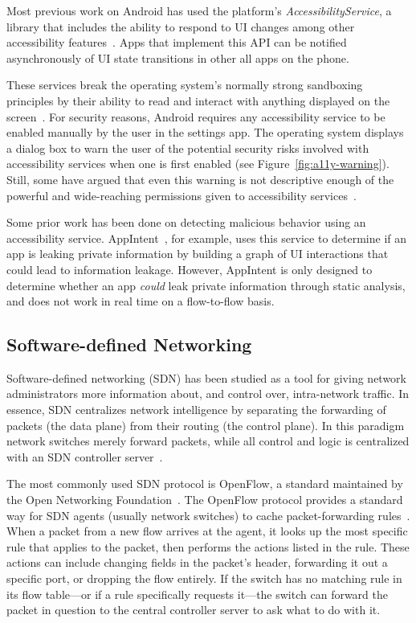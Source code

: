Most previous work on Android has used the platform's
\textit{AccessibilityService}, a library that includes the ability to respond to
UI changes among other accessibility features~\cite{googledevelopers2020}. Apps
that implement this API can be notified asynchronously of UI state transitions
in other all apps on the phone.

These services break the operating system's normally strong
sandboxing principles by their ability to read and interact with anything
displayed on the screen~\cite{kalysch2018}. For security reasons, Android
requires any accessibility service to be enabled manually by the user in the
settings app. The operating system displays a dialog box to warn the user of the
potential security risks involved with accessibility services when one is first
enabled (see Figure~\ref{fig:a11y-warning}). Still, some have argued that even
this warning is not descriptive enough of the powerful and wide-reaching
permissions given to accessibility services~\cite{kalysch2018}.

Some prior work has been done on detecting malicious behavior using an
accessibility service. AppIntent~\cite{yang2013}, for example, uses this service
to determine if an app is leaking private information by building a graph of UI
interactions that could lead to information leakage. However, AppIntent is only
designed to determine whether an app \textit{could} leak private information
through static analysis, and does not work in real time on a flow-to-flow basis.

\subsection{Software-defined Networking}
\label{sec:software-defined-networking}

Software-defined networking (SDN) has been studied as a tool for giving network
administrators more information about, and control over, intra-network traffic.
In essence, SDN centralizes network intelligence by separating the forwarding of
packets (the data plane) from their routing (the control plane). In this
paradigm network switches merely forward packets, while all control and logic is
centralized with an SDN controller server~\cite{kim2013}.

The most commonly used SDN protocol is OpenFlow, a standard maintained by the
Open Networking Foundation~\cite{erickson2011}. The OpenFlow protocol provides a
standard way for SDN agents (usually network switches) to cache
packet-forwarding rules~\cite{openflowspec}. When a packet from a new flow
arrives at the agent, it looks up the most specific rule that applies to the
packet, then performs the actions listed in the rule. These actions can include
changing fields in the packet's header, forwarding it out a specific port, or
dropping the flow entirely. If the switch has no matching rule in its flow
table---or if a rule specifically requests it---the switch can forward the
packet in question to the central controller server to ask what to do with it.

